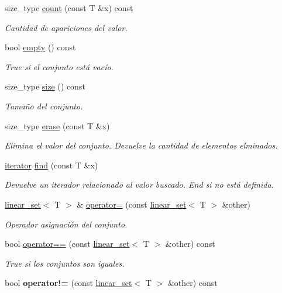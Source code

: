\begin{DoxyCompactItemize}
size\+\_\+type \hyperlink{classlinear__set_a2199271b0b692ca35bfe4f5ee69b300a}{count} (const T \&x) const 
\begin{DoxyCompactList}\small\item\em Cantidad de apariciones del valor. \end{DoxyCompactList}\item 
bool \hyperlink{classlinear__set_ad1ebf082279d7992e12b434d52cf2338}{empty} () const 
\begin{DoxyCompactList}\small\item\em True si el conjunto está vacío. \end{DoxyCompactList}\item 
size\+\_\+type \hyperlink{classlinear__set_a48c78a9f6814516482724214d685540e}{size} () const 
\begin{DoxyCompactList}\small\item\em Tamaño del conjunto. \end{DoxyCompactList}\item 
size\+\_\+type \hyperlink{classlinear__set_a264d97735943af5490e73e469c3e7303}{erase} (const T \&x)
\begin{DoxyCompactList}\small\item\em Elimina el valor del conjunto. Devuelve la cantidad de elementos elminados. \end{DoxyCompactList}\item 
\hyperlink{classlinear__set_1_1iterator}{iterator} \hyperlink{classlinear__set_a415e0c8461f6a702129b7612a538ffb1}{find} (const T \&x)
\begin{DoxyCompactList}\small\item\em Devuelve un iterador relacionado al valor buscado. End si no está definida. \end{DoxyCompactList}\item 
\hyperlink{classlinear__set}{linear\+\_\+set}$<$ T $>$ \& \hyperlink{classlinear__set_a5bea24f94c4ea45550ec4b066ffb8cf1}{operator=} (const \hyperlink{classlinear__set}{linear\+\_\+set}$<$ T $>$ \&other)
\begin{DoxyCompactList}\small\item\em Operador asignación del conjunto. \end{DoxyCompactList}\item 
bool \hyperlink{classlinear__set_a519aaf53184baa0fb250dc13031c1c52}{operator==} (const \hyperlink{classlinear__set}{linear\+\_\+set}$<$ T $>$ \&other) const 
\begin{DoxyCompactList}\small\item\em True si los conjuntos son iguales. \end{DoxyCompactList}\item 
\hypertarget{classlinear__set_a061f4bb78a76d0e67acd0c5fe8133179}{bool {\bfseries operator!=} (const \hyperlink{classlinear__set}{linear\+\_\+set}$<$ T $>$ \&other) const }\label{classlinear__set_a061f4bb78a76d0e67acd0c5fe8133179}


\end{DoxyCompactItemize}
